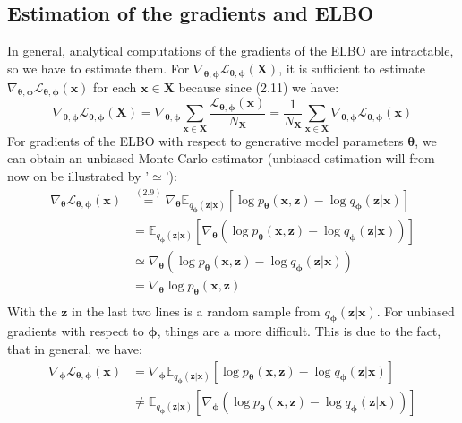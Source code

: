 \documentclass[12pt]{report}
\theoremstyle{definition}
\begin{document}
\subsection{Estimation of the gradients and ELBO}
In general, analytical computations of the gradients of the ELBO are intractable, so we have to estimate them. For $\nabla_{\pmb{\theta}, \pmb{\phi}}\mathcal{L}_{\pmb{\theta}, \pmb{\phi}}(\mathbf{X})$, it is sufficient to estimate $\nabla_{\pmb{\theta}, \pmb{\phi}}\mathcal{L}_{\pmb{\theta}, \pmb{\phi}}(\mathbf{x})$ for each $\mathbf{x} \in \mathbf{X}$ because since (2.11) we have:
\begin{equation}
	\nabla_{\pmb{\theta}, \pmb{\phi}}\mathcal{L}_{\pmb{\theta}, \pmb{\phi}}(\mathbf{X}) = \nabla_{\pmb{\theta}, \pmb{\phi}}  \sum_{\mathbf{x} \in \mathbf{X}} \frac{\mathcal{L}_{\pmb{\theta}, \pmb{\phi}}(\mathbf{x})}{N_{\mathbf{X}}} = \frac{1}{N_{\mathbf{X}}} \sum_{\mathbf{x} \in \mathbf{X}} \nabla_{\pmb{\theta}, \pmb{\phi}} \mathcal{L}_{\pmb{\theta}, \pmb{\phi}}(\mathbf{x})
\end{equation}
For gradients of the ELBO with respect to generative model parameters $\pmb{\theta}$, we can obtain an unbiased Monte Carlo estimator (unbiased estimation will from now on be illustrated by '$\simeq$'):
\begin{equation}
\begin{split}
\nabla_{\pmb{\theta}}\mathcal{L}_{\pmb{\theta}, \pmb{\phi}}(\mathbf{x})
& \stackrel{(2.9)}{=} \nabla_{\pmb{\theta}} \mathbb{E}_{q_{\pmb{\phi}}(\mathbf{z}|\mathbf{x})}\left[ \log p_{\pmb{\theta}}(\mathbf{x}, \mathbf{z}) - \log q_{\pmb{\phi}}(\mathbf{z}|\mathbf{x}) \right]	\\
& = \mathbb{E}_{q_{\pmb{\phi}}(\mathbf{z}|\mathbf{x})}\left[ \nabla_{\pmb{\theta}} (\log p_{\pmb{\theta}}(\mathbf{x}, \mathbf{z}) - \log q_{\pmb{\phi}}(\mathbf{z}|\mathbf{x})) \right] \\
& \simeq \nabla_{\pmb{\theta}} (\log p_{\pmb{\theta}}(\mathbf{x}, \mathbf{z}) - \log q_{\pmb{\phi}}(\mathbf{z}|\mathbf{x})) \\
& = \nabla_{\pmb{\theta}} \log p_{\pmb{\theta}}(\mathbf{x}, \mathbf{z})\\
\end{split}
\end{equation}
With the $\mathbf{z}$ in the last two lines is a random sample from $q_{\pmb{\phi}}(\mathbf{z}|\mathbf{x})$. For unbiased gradients with respect to $\pmb{\phi}$, things are a more difficult. This is due to the fact, that in general, we have:
\begin{equation}
\begin{split}
\nabla_{\pmb{\phi}}\mathcal{L}_{\pmb{\theta}, \pmb{\phi}}(\mathbf{x})
& = \nabla_{\pmb{\phi}} \mathbb{E}_{q_{\pmb{\phi}}(\mathbf{z}|\mathbf{x})}\left[ \log p_{\pmb{\theta}}(\mathbf{x}, \mathbf{z}) - \log q_{\pmb{\phi}}(\mathbf{z}|\mathbf{x}) \right]	\\
& \neq \mathbb{E}_{q_{\pmb{\phi}}(\mathbf{z}|\mathbf{x})}\left[ \nabla_{\pmb{\phi}} (\log p_{\pmb{\theta}}(\mathbf{x}, \mathbf{z}) - \log q_{\pmb{\phi}}(\mathbf{z}|\mathbf{x})) \right] \\
\end{split}
\end{equation}
\end{document}
